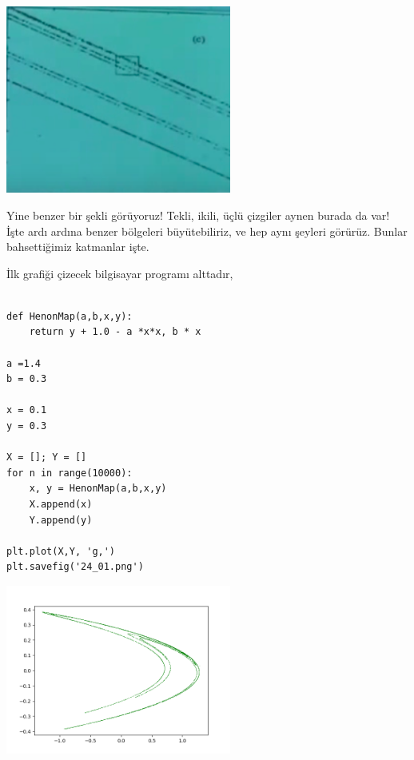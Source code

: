 \documentclass[12pt,fleqn]{article}\usepackage{../../common}
\begin{document}
\includegraphics[width=20em]{24_08.png}

Yine benzer bir şekli görüyoruz! Tekli, ikili, üçlü çizgiler aynen burada
da var! İşte ardı ardına benzer bölgeleri büyütebiliriz, ve hep aynı
şeyleri görürüz. Bunlar bahsettiğimiz katmanlar işte. 

İlk grafiği çizecek bilgisayar programı alttadır,

\begin{verbatim}

def HenonMap(a,b,x,y):
	return y + 1.0 - a *x*x, b * x

a =1.4
b = 0.3

x = 0.1
y = 0.3

X = []; Y = []
for n in range(10000):
    x, y = HenonMap(a,b,x,y)
    X.append(x)
    Y.append(y)
    
plt.plot(X,Y, 'g,')
plt.savefig('24_01.png')
\end{verbatim}

\includegraphics[width=20em]{24_01.png}
\end{document}
